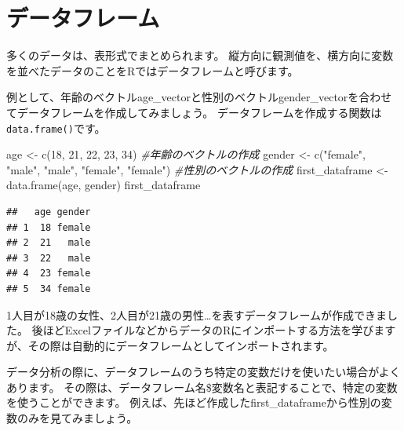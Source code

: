 \documentclass[
]{book}
\newenvironment{Shaded}{\begin{snugshade}}{\end{snugshade}}
\newcommand{\CommentTok}[1]{\textcolor[rgb]{0.56,0.35,0.01}{\textit{#1}}}
\newcommand{\DecValTok}[1]{\textcolor[rgb]{0.00,0.00,0.81}{#1}}
\newcommand{\FunctionTok}[1]{\textcolor[rgb]{0.00,0.00,0.00}{#1}}
\newcommand{\NormalTok}[1]{#1}
\newcommand{\OtherTok}[1]{\textcolor[rgb]{0.56,0.35,0.01}{#1}}
\newcommand{\SpecialCharTok}[1]{\textcolor[rgb]{0.00,0.00,0.00}{#1}}
\newcommand{\StringTok}[1]{\textcolor[rgb]{0.31,0.60,0.02}{#1}}
\begin{document}
\hypertarget{ux30c7ux30fcux30bfux30d5ux30ecux30fcux30e0}{%
\section*{データフレーム}\label{ux30c7ux30fcux30bfux30d5ux30ecux30fcux30e0}}

多くのデータは、表形式でまとめられます。 縦方向に観測値を、横方向に変数を並べたデータのことをRではデータフレームと呼びます。

例として、年齢のベクトルage\_vectorと性別のベクトルgender\_vectorを合わせてデータフレームを作成してみましょう。 データフレームを作成する関数は\texttt{data.frame()}です。

\begin{Shaded}
\begin{Highlighting}[]
\NormalTok{age }\OtherTok{\textless{}{-}} \FunctionTok{c}\NormalTok{(}\DecValTok{18}\NormalTok{, }\DecValTok{21}\NormalTok{, }\DecValTok{22}\NormalTok{, }\DecValTok{23}\NormalTok{, }\DecValTok{34}\NormalTok{) }\CommentTok{\#年齢のベクトルの作成}
\NormalTok{gender }\OtherTok{\textless{}{-}} \FunctionTok{c}\NormalTok{(}\StringTok{"female"}\NormalTok{, }\StringTok{"male"}\NormalTok{, }\StringTok{"male"}\NormalTok{, }\StringTok{"female"}\NormalTok{, }\StringTok{"female"}\NormalTok{) }\CommentTok{\#性別のベクトルの作成}
\NormalTok{first\_dataframe }\OtherTok{\textless{}{-}} \FunctionTok{data.frame}\NormalTok{(age, gender)}
\NormalTok{first\_dataframe}
\end{Highlighting}
\end{Shaded}

\begin{verbatim}
##   age gender
## 1  18 female
## 2  21   male
## 3  22   male
## 4  23 female
## 5  34 female
\end{verbatim}

1人目が18歳の女性、2人目が21歳の男性\ldots を表すデータフレームが作成できました。 後ほどExcelファイルなどからデータのRにインポートする方法を学びますが、その際は自動的にデータフレームとしてインポートされます。

データ分析の際に、データフレームのうち特定の変数だけを使いたい場合がよくあります。 その際は、データフレーム名\$変数名と表記することで、特定の変数を使うことができます。 例えば、先ほど作成したfirst\_dataframeから性別の変数のみを見てみましょう。

\begin{Shaded}
\end{Shaded}
\end{document}

